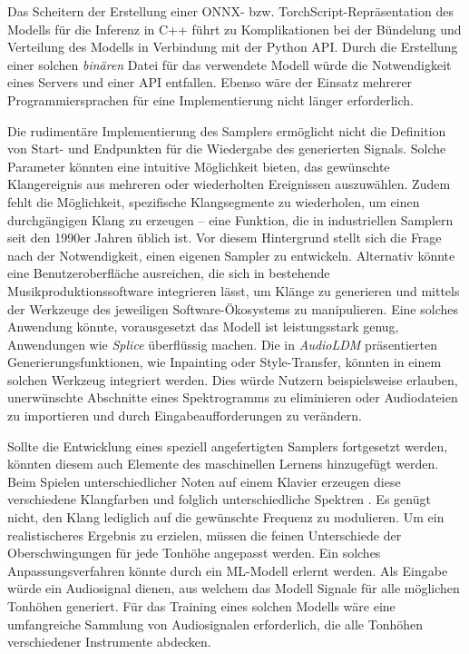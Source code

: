 \documentclass[
  a4paper,  %
  twoside,  %
  bibliography=totoc,
  headsepline,
  cleardoublepage=empty,
  parskip=half,
  draft=false
]{scrbook}
\begin{document}
Das Scheitern der Erstellung einer ONNX- bzw. TorchScript-Repräsentation des Modells für die Inferenz in C++ führt zu Komplikationen bei der Bündelung und Verteilung des Modells in Verbindung mit der Python API. Durch die Erstellung einer solchen \emph{binären} Datei für das verwendete Modell würde die Notwendigkeit eines Servers und einer API entfallen. Ebenso wäre der Einsatz mehrerer Programmiersprachen für eine Implementierung nicht länger erforderlich.

Die rudimentäre Implementierung des Samplers ermöglicht nicht die Definition von Start- und Endpunkten für die Wiedergabe des generierten Signals. Solche Parameter könnten eine intuitive Möglichkeit bieten, das gewünschte Klangereignis aus mehreren oder wiederholten Ereignissen auszuwählen. Zudem fehlt die Möglichkeit, spezifische Klangsegmente zu wiederholen, um einen durchgängigen Klang zu erzeugen – eine Funktion, die in industriellen Samplern seit den 1990er Jahren üblich ist. Vor diesem Hintergrund stellt sich die Frage nach der Notwendigkeit, einen eigenen Sampler zu entwickeln. Alternativ könnte eine Benutzeroberfläche ausreichen, die sich in bestehende Musikproduktionssoftware integrieren lässt, um Klänge zu generieren und mittels der Werkzeuge des jeweiligen Software-Ökosystems zu manipulieren. Eine solches Anwendung könnte, vorausgesetzt das Modell ist leistungsstark genug, Anwendungen wie \emph{Splice} \cite{noauthor_royalty-free_nodate} überflüssig machen. Die in \emph{AudioLDM} \cite{liu_audioldm_2023} präsentierten Generierungsfunktionen, wie Inpainting oder Style-Transfer, könnten in einem solchen Werkzeug integriert werden. Dies würde Nutzern beispielsweise erlauben, unerwünschte Abschnitte eines Spektrogramms zu eliminieren oder Audiodateien zu importieren und durch Eingabeaufforderungen zu verändern.

Sollte die Entwicklung eines speziell angefertigten Samplers fortgesetzt werden, könnten diesem auch Elemente des maschinellen Lernens hinzugefügt werden. Beim Spielen unterschiedlicher Noten auf einem Klavier erzeugen diese verschiedene Klangfarben und folglich unterschiedliche Spektren \cite{parker_good_2009}. Es genügt nicht, den Klang lediglich auf die gewünschte Frequenz zu modulieren. Um ein realistischeres Ergebnis zu erzielen, müssen die feinen Unterschiede der Oberschwingungen für jede Tonhöhe angepasst werden. Ein solches Anpassungsverfahren könnte durch ein ML-Modell erlernt werden. Als Eingabe würde ein Audiosignal dienen, aus welchem das Modell Signale für alle möglichen Tonhöhen generiert. Für das Training eines solchen Modells wäre eine umfangreiche Sammlung von Audiosignalen erforderlich, die alle Tonhöhen verschiedener Instrumente abdecken.
\end{document}
